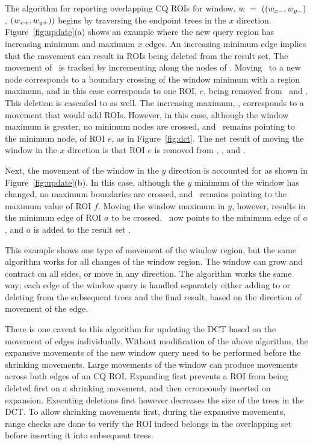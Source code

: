 \documentclass{ucdthesis}       %
\begin{document}
The algorithm for reporting overlapping \ac{CQ} \acp{ROI} for window,
$w~=~((w_{x-}, w_{y-})$, $(w_{x+}, w_{y+}))$ begins by traversing the
endpoint trees in the $x$ direction.  Figure~\ref{fig:update}(a) shows
an example where the new query region has increasing minimum and
maximum $x$ edges.  An increasing minimum edge implies that the
movement can result in \acp{ROI} being deleted from the result set.
The movement of \wxn\ is tracked by incrementing along the nodes of
\Xx.  Moving \wxn\ to a new node corresponds to a boundary crossing of
the window minimum with a region maximum, and in this case corresponds
to one \ac{ROI}, $e$, being removed from \Yn\ and \Yx.  This deletion
is cascaded to  as well.  The increasing maximum, \wxx,
corresponds to a movement that would add \acp{ROI}.  However, in this
case, although the window maximum is greater, no minimum nodes are
crossed, and \wxx\ remains pointing to the minimum node, of \ac{ROI}
$e$, as in Figure~\ref{fig:dct}.  The net result of moving the window
in the $x$ direction is that \ac{ROI} $e$ is removed from \Yn, \Yx,
and .

Next, the movement of the window in the $y$ direction is accounted for
as shown in Figure~\ref{fig:update}(b).  In this case, although the
$y$ minimum of the window has changed, no maximum boundaries are
crossed, and \wyn\ remains pointing to the maximum value of \ac{ROI} $f$.
Moving the window maximum in $y$, however, results in the minimum edge
of \ac{ROI} $a$ to be crossed.  \wyx\ now points to the minimum edge of
$a$, and $a$ is added to the result set .

This example shows one type of movement of the window region, but the
same algorithm works for all changes of the window region.  The window
can grow and contract on all sides, or move in any direction.  The
algorithm works the same way; each edge of the window query is handled
separately either adding to or deleting from the subsequent trees and
the final result, based on the direction of movement of the edge.

There is one caveat to this algorithm for updating the \ac{DCT} based on
the movement of edges individually.  Without modification of the above
algorithm, the expansive movements of the new window query need to be
performed before the shrinking movements.  Large movements of the
window can produce movements across both edges of an \ac{CQ} \ac{ROI}.
Expanding first prevents a \ac{ROI} from being deleted first on a
shrinking movement, and then erroneously inserted on expansion.
Executing deletions first however decreases the size of the trees in
the \ac{DCT}.  To allow shrinking movements first, during the expansive
movements, range checks are done to verify the \ac{ROI} indeed belongs
in the overlapping set before inserting it into subsequent trees.
\end{document}
